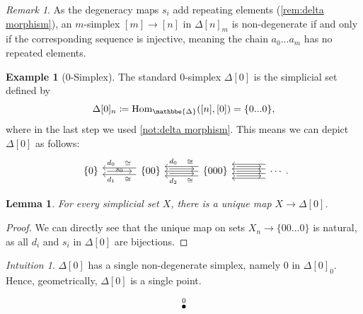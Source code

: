 \documentclass[11pt, a4paper]{amsart}
\def\DDelta{{\mathbbe{\Delta}}}
\newcommand{\DD}{\DDelta}
\newcommand{\Hom}{\mathrm{Hom}}
\newtheorem{lemma}[equation]{Lemma}
\theoremstyle{definition}
\newtheorem{example}[equation]{Example}
\theoremstyle{remark}
\newtheorem{remark}[equation]{Remark}
\newtheorem{intuition}[equation]{Intuition}
\numberwithin{equation}{section}
\begin{document}
\begin{remark} \label{rem:non-degenerate}
  As the degeneracy maps $s_i$ add repeating elements (\cref{rem:delta morphism}), an $m$-simplex $[m] \to [n]$ in $\Delta[n]_m$ is non-degenerate if and only if the corresponding sequence is injective, meaning the chain $a_0... a_m$ has no repeated elements.
\end{remark}

\begin{example}[0-Simplex]
  The standard $0$-simplex $\Delta[0]$ is the simplicial set defined by \[\Delta[0]_n \coloneq \Hom_{\DD}([n],[0]) = \{0...0\},\] where in the last step we used \cref{not:delta morphism}. This means we can depict $\Delta[0]$ as follows:
\[
  \begin{tikzcd}[column sep=1.2cm]
   \{0\} \arrow[r, shorten >=1ex,shorten <=1ex, "s_0"'  yshift= .2cm]
   & \{00\} 
   \arrow[l, shift left=1.4, "d_1" near end, "\cong" near start] \arrow[l, shift right=1.4, "d_0"' near end, "\cong"' near start] 
   \arrow[r, shift right, shorten >=1ex,shorten <=1ex ] \arrow[r, shift left, shorten >=1ex,shorten <=1ex] 
   & \{000\} 
   \arrow[l] \arrow[l, shift left=2, "d_2" near end, "\cong" near start] \arrow[l, shift right=2, "d_0"' near end, "\cong"' near start] 
   \arrow[r, shorten >=1ex,shorten <=1ex] \arrow[r, shift left=2, shorten >=1ex,shorten <=1ex] 
   \arrow[r, shift right=2, shorten >=1ex,shorten <=1ex]
   & \cdots 
   \arrow[l, shift right=1] \arrow[l, shift left=1] \arrow[l, shift right=3] \arrow[l, shift left=3] 
 \end{tikzcd}.
  \]
\end{example}

\begin{lemma} \label{lemma:delta 0}
  For every simplicial set $X$, there is a unique map $X \to \Delta[0]$.
\end{lemma}
\begin{proof}
  We can directly see that the unique map on sets $X_n \to \{00...0\}$ is natural, as all $d_i$ and $s_i$ in $\Delta[0]$ are bijections.
\end{proof}

\begin{intuition}
  $\Delta[0]$ has a single non-degenerate simplex, namely $0$ in $\Delta[0]_0$. Hence, geometrically, $\Delta[0]$ is a single point.
  \[ 
  \begin{tikzcd} 
    \overset{0}{\bullet}
  \end{tikzcd}
  \]
\end{intuition}
\end{document}
